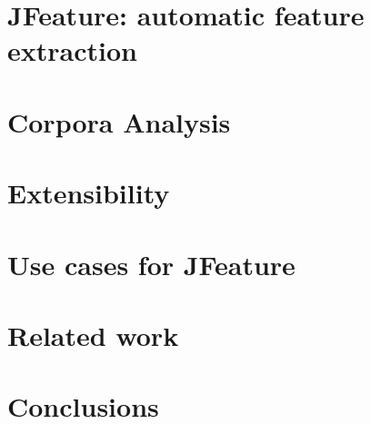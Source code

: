\section{JFeature: automatic feature extraction}
\label{sec:jfeature}


\section{Corpora Analysis}
\label{sec:corpora}


\section{Extensibility}
\label{sec:extension}


\section{Use cases for JFeature}
\label{sec:discussion}


\section{Related work}
\label{sec:related-works}


\section{Conclusions}
\label{sec:conclusions}



% 
% 







% 

